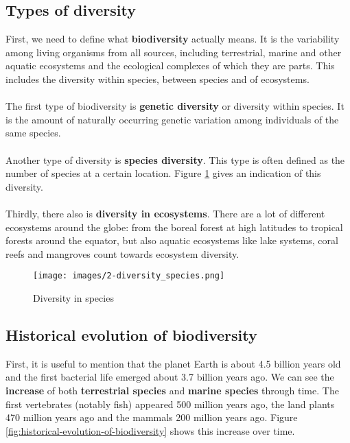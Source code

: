 \documentclass[../summary.tex]{subfiles}
\begin{document}
	\subsection{Types of diversity}
	First, we need to define what \textbf{biodiversity} actually means. It is the variability among living organisms from all sources, including terrestrial, marine and other aquatic ecosystems and the ecological complexes of which they are parts. This includes the diversity within species, between species and of ecosystems.
	\\\\
	The first type of biodiversity is \textbf{genetic diversity} or diversity within species. It is the amount of naturally occurring genetic variation among individuals of the same species.
	\\\\
	Another type of diversity is \textbf{species diversity}. This type is often defined as the number of species at a certain location. Figure \ref{fig:diversity_species} gives an indication of this diversity.
	\\\\
	Thirdly, there also is \textbf{diversity in ecosystems}. There are a lot of different ecosystems around the globe: from the boreal forest at high latitudes to tropical forests around the equator, but also aquatic ecosystems like lake systems, coral reefs and mangroves count towards ecosystem diversity.
	\\
	\begin{figure}[H]
		\centering
		\texttt{[image: images/2-diversity\_species.png]}
		\caption{Diversity in species}
		\label{fig:diversity_species}
	\end{figure}
	
	\subsection{Historical evolution of biodiversity}

	First, it is useful to mention that the planet Earth is about 4.5 billion years old and the first bacterial life emerged about 3.7 billion years ago. We can see the \textbf{increase} of both \textbf{terrestrial species} and \textbf{marine species} through time. The first vertebrates (notably fish) appeared 500 million years ago, the land plants 470 million years ago and the mammals 200 million years ago. Figure \ref{fig:historical-evolution-of-biodiversity} shows this increase over time.
	
\end{document}
